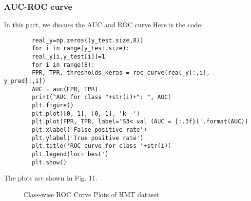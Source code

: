 \documentclass[conference]{IEEEtran}
\begin{document}
	\subsubsection{AUC-ROC curve}
	In this part, we discuss the AUC and ROC curve.Here is the code:
	\begin{lstlisting}
		real_y=np.zeros((y_test.size,8))
		for i in range(y_test.size):
		real_y[i,y_test[i]]=1
		for i in range(8):
		FPR, TPR, thresholds_keras = roc_curve(real_y[:,i], y_pred[:,i]) 
		AUC = auc(FPR, TPR)  
		print("AUC for class "+str(i)+": ", AUC)
		plt.figure()
		plt.plot([0, 1], [0, 1], 'k--')
		plt.plot(FPR, TPR, label='S3< val (AUC = {:.3f})'.format(AUC))
		plt.xlabel('False positive rate')
		plt.ylabel('True positive rate')
		plt.title('ROC curve for class '+str(i))
		plt.legend(loc='best')
		plt.show()    
	\end{lstlisting}
	
	The plots are shown in Fig. 11.
	
	\begin{figure}[h]
		\centering  
		
		
		\caption{Class-wise ROC Curve Plots of HMT dataset}
		\label{Fig.ba}
	\end{figure}
	
\end{document}
